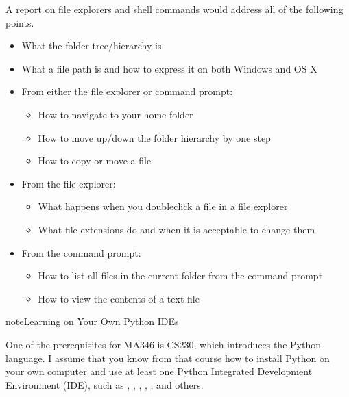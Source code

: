 \documentclass[letterpaper,10pt,english]{sphinxmanual}
\begin{document}
A report on file explorers and shell commands would address all of the following points.
\begin{itemize}
\item {} 
What the folder tree/hierarchy is

\item {} 
What a file path is and how to express it on both Windows and OS X

\item {} 
From either the file explorer or command prompt:
\begin{itemize}
\item {} 
How to navigate to your home folder

\item {} 
How to move up/down the folder hierarchy by one step

\item {} 
How to copy or move a file

\end{itemize}

\item {} 
From the file explorer:
\begin{itemize}
\item {} 
What happens when you double\sphinxhyphen{}click a file in a file explorer

\item {} 
What file extensions do and when it is acceptable to change them

\end{itemize}

\item {} 
From the command prompt:
\begin{itemize}
\item {} 
How to list all files in the current folder from the command prompt

\item {} 
How to view the contents of a text file

\end{itemize}

\end{itemize}

\begin{sphinxadmonition}{note}{Learning on Your Own \sphinxhyphen{} Python IDEs}

One of the prerequisites for MA346 is CS230, which introduces the Python language.  I assume that you know from that course how to install Python on your own computer and use at least one Python Integrated Development Environment (IDE), such as , , , , , and others.
\end{sphinxadmonition}
\end{document}

